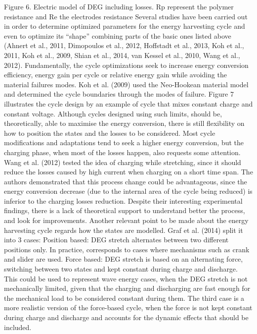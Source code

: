 Figure 6. Electric model of DEG including losses. Rp represent the polymer resistance and Re the electrodes resistance
	Several studies have been carried out in order to determine optimized parameters for the energy harvesting cycle and even to optimize its “shape” combining parts of the basic ones listed above (Ahnert et al., 2011, Dimopoulos et al., 2012, Hoffstadt et al., 2013, Koh et al., 2011, Koh et al., 2009, Shian et al., 2014, van Kessel et al., 2010, Wang et al., 2012). Fundamentally, the cycle optimizations seek to increase energy conversion efficiency, energy gain per cycle or relative energy gain while avoiding the material failures modes. Koh et al. (2009)  used the Neo-Hookean material model and determined the cycle boundaries through the modes of failure. Figure 7 illustrates the cycle design by an example of cycle that mixes constant charge and constant voltage. Although cycles designed using such limits, should be, theoretically, able to maximise the energy conversion, there is still flexibility on how to position the states and the losses to be considered.
		Most cycle modifications and adaptations tend to seek a higher energy conversion, but the charging phase, when most of the losses happen, also requests some attention. Wang et al. (2012) tested the idea of charging while stretching, since it should reduce the losses caused by high current when charging on a short time span. The authors demonstrated that this process change could be advantageous, since the energy conversion decrease (due to the internal area of the cycle being reduced) is inferior to the charging losses reduction. Despite their interesting experimental findings, there is a lack of theoretical support to understand better the process, and look for improvements.
	Another relevant point to be made about the energy harvesting cycle regards how the states are modelled. Graf et al. (2014) split it into 3 cases:
	Position based: DEG stretch alternates between two different positions only. In practice, corresponds to cases where mechanisms such as crank and slider are used.
	Force based: DEG stretch is based on an alternating force, switching between two states and kept constant during charge and discharge. This could be used to represent wave energy cases, when the DEG stretch is not mechanically limited, given that the charging and discharging are fast enough for the mechanical load to be considered constant during them.
	The third case is a more realistic version of the force-based cycle, when the force is not kept constant during charge and discharge and accounts for the dynamic effects that should be included.



